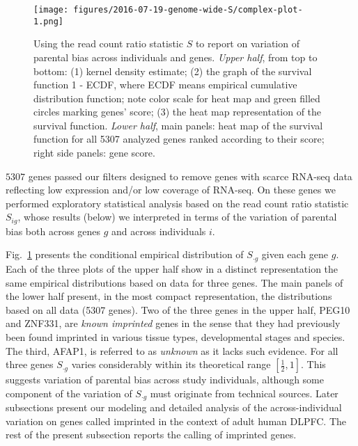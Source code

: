 \documentclass[letterpaper]{article}
\begin{document}
\begin{figure}
\begin{center}
\texttt{[image: figures/2016-07-19-genome-wide-S/complex-plot-1.png]}
\end{center}
\caption{
Using the read count ratio statistic \(S\) to report on variation of parental
bias across individuals and genes.  \emph{Upper half}, from top to bottom: (1)
kernel density estimate; (2) the graph of the survival function 1 - ECDF,
where ECDF means empirical cumulative distribution function; note color scale
for heat map and green filled circles marking genes' score; (3) the heat map
representation of the survival function.  \emph{Lower half}, main panels: heat
map of the survival function for all 5307 analyzed genes ranked according to
their score; right side panels: gene score.
}
\label{fig:ranking-genes}
\end{figure}

\(5307\) genes passed our filters designed to remove genes with scarce RNA-seq
data reflecting low expression and/or low coverage of RNA-seq.  On these genes
we performed exploratory statistical analysis based on the read count ratio
statistic \(S_{ig}\), whose results (below) we interpreted in terms of the
variation of parental bias both across genes \(g\) and across individuals \(i\).

Fig.~\ref{fig:ranking-genes} presents the conditional empirical distribution
of \(S_{\cdot g}\) given each gene \(g\).  Each of the three plots of the
upper half show in a distinct representation the same empirical distributions
based on data for three genes.  The main panels of the lower half present, in
the most compact representation, the distributions based on all data (5307
genes).  Two of the three genes in the upper half, PEG10 and ZNF331, are
\emph{known imprinted} genes in the sense that they had previously been found
imprinted in various tissue types, developmental stages and species.  The
third, AFAP1, is referred to as \emph{unknown} as it lacks such evidence.  For
all three genes \(S_{\cdot g}\) varies considerably within its theoretical
range \([\frac{1}{2}, 1]\).  This suggests variation of parental bias across
study individuals, although some component of the variation of \(S_{\cdot g}\)
must originate from technical sources.  Later subsections present our modeling
and detailed analysis of the across-individual variation on genes called
imprinted in the context of adult human DLPFC.  The rest of the present
subsection reports the calling of imprinted genes.
\end{document}
